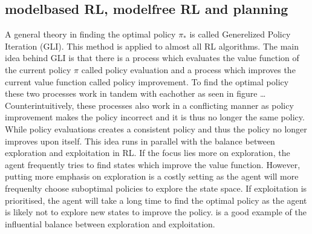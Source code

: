 \documentclass[letterpaper,10pt,english]{jupyterBook}
\begin{document}
\subsection{model\sphinxhyphen{}based RL, model\sphinxhyphen{}free RL and planning}
\label{\detokenize{Reinforcement_learning:model-based-rl-model-free-rl-and-planning}}
\sphinxAtStartPar
A general theory in finding the optimal policy \(\pi_*\) is called Generelized Policy Iteration (GLI). This method is applied to almost all RL algorithms. The main idea behind GLI is that there is a process which evaluates the value function of the current policy \(\pi\) called policy evaluation and a process which improves the current value function called policy improvement. To find the optimal policy these two processes work in tandem with eachother as seen in figure … Counterintuitively, these processes also work in a conflicting manner as policy improvement makes the policy incorrect and it is thus no longer the same policy. While policy evaluations creates a consistent policy and thus the policy no longer improves upon itself. This idea runs in parallel with the balance between exploration and exploitation in RL.  If the focus lies more on exploration, the agent frequently tries to find states which improve the value function. However, putting more emphasis on exploration is a costly setting as the agent will more frequenlty choose suboptimal policies to explore the state space. If exploitation is prioritised, the agent will take a long time to find the optimal policy as the agent is likely not to explore new states to improve the policy.  is a good example of the influential balance between exploration and exploitation.

\sphinxAtStartPar
{}
\end{document}

